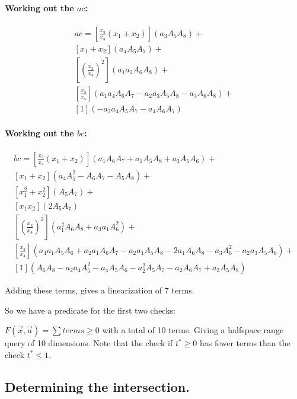 \documentclass{article}
\begin{document}
\paragraph*{Working out the $ac$:}

\begin{align*}
    ac = 
     \left[\frac{x_3}{x_4}(x_1 + x_2)\right](a_3 A_5 A_8) + \\
     [x_1 + x_2](a_4 A_5 A_7) +\\
    \left [\left( \frac{x_3}{x_4} \right)^2 \right](a_1 a_3 A_6 A_8) +\\
      \left[\frac{x_3}{x_4}\right](a_1 a_4 A_6 A_7- a_2 a_3 A_5 A_8- a_3 A_6 A_8) +\\
     [1](- a_2 a_4 A_5 A_7 - a_4 A_6 A_7)
\end{align*}

\paragraph{Working out the $bc$:}

\begin{align*}
     bc =
     \left[\frac{x_3}{x_4}(x_1 + x_2)\right](a_1 A_6 A_7 + a_1 A_5 A_8 + a_3 A_5 A_6) + \\
     [x_1 + x_2](  a_4 A_5^2- A_6 A_7- A_5 A_8) +\\
    [x_1^2 + x_2^2](A_5 A_7) + \\
    [x_1x_2](2 A_5 A_7) \\
    \left [\left( \frac{x_3}{x_4} \right)^2 \right](a_1^2 A_6 A_8+ a_3 a_1 A_6^2 ) + \\
    \left[\frac{x_3}{x_4}\right](  a_4 a_1 A_5 A_6+ a_2 a_1 A_6 A_7- a_2 a_1 A_5 A_8- 2 a_1 A_6 A_8- a_3 A_6^2- a_2 a_3 A_5 A_6) +\\  [1](A_6 A_8- a_2 a_4 A_5^2- a_4 A_5 A_6 - a_2^2 A_5 A_7 - a_2 A_6 A_7 + a_2 A_5 A_8)
\end{align*}

Adding these terms, gives a linearization of 7 terms.



So we have a predicate for the first two checks:

$F(\vec{x}, \vec{a}) = \sum terms \ge 0$ with a total of 10 terms. Giving a halfspace range query of 10 dimensions. 
Note that the check if $t^* \ge 0$ has fewer terms than the check $t^* \le 1$.



\subsection{Determining the intersection.}
\end{document}
